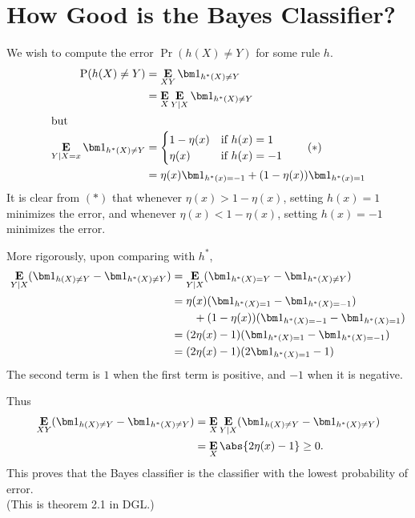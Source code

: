 \section{How Good is the Bayes Classifier?} \label{sec:bayest}
We wish to compute the error $\Pr(h(X) \ne Y)$ for some rule $h$.
\begin{align*}
    \Pr(h(X) \ne Y)
        &= \E_{XY} \ind{h^*(X) \ne Y} \\
        &= \E_X \E_{Y \mid X} \ind{h^*(X) \ne Y} \\
    \intertext{but}
    \E_{Y \mid X = x} \ind{h^*(X) \ne Y}
        &= \begin{cases}
            1 - \eta(x) & \text{if } h(x) = 1 \\
            \eta(x) & \text{if } h(x) = -1
        \end{cases} \tag{$*$} \\
        &= \eta(x) \ind{h^*(x) = -1} + (1 - \eta(x)) \ind{h^*(x) = 1}
\end{align*}
It is clear from $(*)$ that whenever $\eta(x) > 1 - \eta(x)$, setting
$h(x) = 1$ minimizes the error, and whenever $\eta(x) < 1 - \eta(x)$,
setting $h(x) = -1$ minimizes the error.

More rigorously, upon comparing with $h^*$,
\begin{align*}
    \E_{Y \mid X} (\ind{h(X) \ne Y} - \ind{h^*(X) \ne Y})
        &= \E_{Y \given X} (\ind{h^*(X) = Y} - \ind{h^*(X) \ne Y}) \\
        &= \eta(x) (\ind{h^*(X) = 1} - \ind{h^*(X) = -1}) \\
        &\qquad + (1 - \eta(x)) (\ind{h^*(X) = -1} - \ind{h^*(X) = 1}) \\
        &= (2 \eta(x) - 1)(\ind{h^*(X) = 1} - \ind{h^*(X) = -1}) \\
        &= (2 \eta(x) - 1)(2 \ind{h^*(X) = 1} - 1)
\end{align*}
The second term is $1$ when the first term is positive, and $-1$ when it is
negative.

Thus \begin{align*}
    \E_{XY} (\ind{h(X) \ne Y} - \ind{h^*(X) \ne Y})
        &= \E_X \E_{Y \mid X} (\ind{h(X) \ne Y} - \ind{h^*(X) \ne Y}) \\
        &= \E_X \abs{2 \eta(x) - 1} \ge 0.
\end{align*}
This proves that the Bayes classifier is the classifier with the lowest
probability of error. \\
(This is theorem 2.1 in DGL.)
